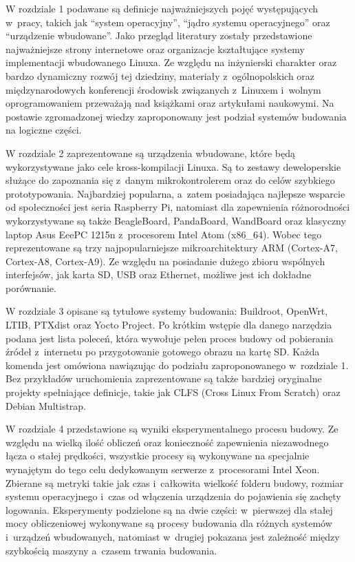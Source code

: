 \documentclass[printmode]{mgr}
\begin{document}
W rozdziale 1 podawane są definicje najważniejszych pojęć występujących w~pracy, takich jak ``system operacyjny'', ``jądro systemu operacyjnego'' oraz ``urządzenie wbudowane''.
Jako przegląd literatury zostały przedstawione najważniejsze strony internetowe oraz organizacje kształtujące systemy implementacji wbudowanego Linuxa.
Ze względu na inżynierski charakter oraz bardzo dynamiczny rozwój tej dziedziny, materiały z~ogólnopolskich oraz międzynarodowych konferencji środowisk związanych z~Linuxem i~wolnym oprogramowaniem przeważają nad książkami oraz artykułami naukowymi.
Na postawie zgromadzonej wiedzy zaproponowany jest podział systemów budowania na logiczne części.

W rozdziale 2 zaprezentowane są urządzenia wbudowane, które będą wykorzystywane jako cele kross-kompilacji Linuxa.
Są to zestawy deweloperskie służące do zapoznania się z~danym mikrokontrolerem oraz do celów szybkiego prototypowania.
Najbardziej popularna, a~zatem posiadająca najlepsze wsparcie od społeczności jest seria Raspberry Pi, natomiast dla zapewnienia różnorodności wykorzystywane są także BeagleBoard, PandaBoard, WandBoard oraz klasyczny laptop Asus EeePC 1215n z~procesorem Intel Atom (x86\_64).
Wobec tego reprezentowane są trzy najpopularniejsze mikroarchitektury ARM (Cortex-A7, Cortex-A8, Cortex-A9).
Ze względu na posiadanie dużego zbioru wspólnych interfejsów, jak karta SD, USB oraz Ethernet, możliwe jest ich dokładne porównanie.

W rozdziale 3 opisane są tytułowe systemy budowania: Buildroot, OpenWrt, LTIB, PTXdist oraz Yocto Project.
Po krótkim wstępie dla danego narzędzia podana jest lista poleceń, która wywołuje pełen proces budowy od pobierania źródeł z~internetu po przygotowanie gotowego obrazu na kartę SD.
Każda komenda jest omówiona nawiązując do podziału zaproponowanego w~rozdziale 1.
Bez przykładów uruchomienia zaprezentowane są także bardziej oryginalne projekty spełniające definicje, takie jak CLFS (Cross Linux From Scratch) oraz Debian Multistrap.

W rozdziale 4 przedstawione są wyniki eksperymentalnego procesu budowy.
Ze względu na wielką ilość obliczeń oraz konieczność zapewnienia niezawodnego łącza o stałej prędkości, wszystkie procesy są wykonywane na specjalnie wynajętym do tego celu dedykowanym serwerze z~procesorami Intel Xeon.
Zbierane są metryki takie jak czas i~całkowita wielkość folderu budowy, rozmiar systemu operacyjnego i~czas od włączenia urządzenia do pojawienia się zachęty logowania.
Eksperymenty podzielone są na dwie części: w~pierwszej dla stałej mocy obliczeniowej wykonywane są procesy budowania dla różnych systemów i~urządzeń wbudowanych, natomiast w~drugiej pokazana jest zależność między szybkością maszyny a~czasem trwania budowania.
\end{document}
